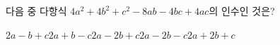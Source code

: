 다음 중 다항식 $4a^2+4b^2+c^2-8ab-4bc+4ac$의 인수인 것은?
\begin{choices32}{$2a-b+c$}{$2a+b-c$}{$2a-2b+c$}{$2a-2b-c$}{$2a+2b+c$}\end{choices32}
